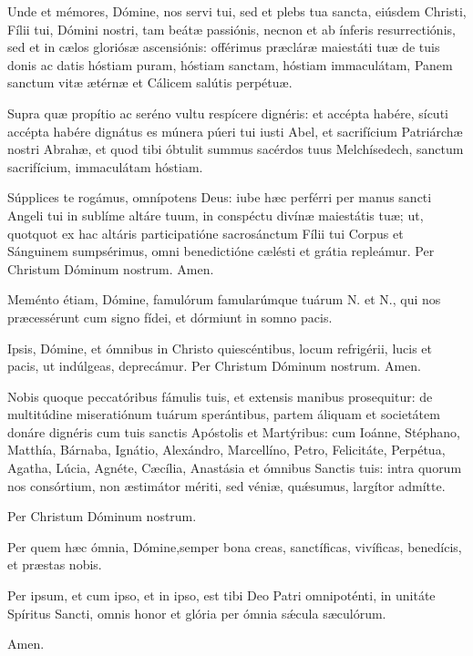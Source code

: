 Unde et mémores, Dómine, nos servi tui, sed et plebs tua sancta, eiúsdem Christi, Fílii tui, Dómini nostri, tam beátæ passiónis, necnon et ab ínferis resurrectiónis, sed et in cælos gloriósæ ascensiónis: offérimus præcláræ maiestáti tuæ de tuis donis ac datis hóstiam puram, hóstiam sanctam, hóstiam immaculátam, Panem sanctum vitæ ætérnæ et Cálicem salútis perpétuæ.

Supra quæ propítio ac seréno vultu respícere dignéris: et accépta habére, sícuti accépta habére dignátus es múnera púeri tui iusti Abel, et sacrifícium Patriárchæ nostri Abrahæ, et quod tibi óbtulit summus sacérdos tuus Melchísedech, sanctum sacrifícium, immaculátam hóstiam.

Súpplices te rogámus, omnípotens Deus: iube hæc perférri per manus sancti Angeli tui in sublíme altáre tuum, in conspéctu divínæ maiestátis tuæ; ut, quotquot ex hac altáris participatióne sacrosánctum Fílii tui Corpus et Sánguinem sumpsérimus, omni benedictióne cælésti et grátia repleámur. Per Christum Dóminum nostrum. Amen.

Meménto étiam, Dómine, famulórum famularúmque tuárum {\color{red}N.} et {\color{red}N.}, qui nos præcessérunt cum signo fídei, et dórmiunt in somno pacis.

Ipsis, Dómine, et ómnibus in Christo quiescéntibus, locum refrigérii, lucis et pacis, ut indúlgeas, deprecámur. Per Christum Dóminum nostrum. Amen.

Nobis quoque peccatóribus fámulis tuis, et extensis manibus prosequitur: de multitúdine miseratiónum tuárum sperántibus, partem áliquam et societátem donáre dignéris cum tuis sanctis Apóstolis et Martýribus: cum Ioánne, Stéphano, Matthía, Bárnaba, Ignátio, Alexándro, Marcellíno, Petro, Felicitáte, Perpétua, Agatha, Lúcia, Agnéte, Cæcília, Anastásia et ómnibus Sanctis tuis: intra quorum nos consórtium, non æstimátor mériti, sed véniæ, quǽsumus, largítor admítte.

Per Christum Dóminum nostrum.

Per quem hæc ómnia, Dómine,semper bona creas, sanctíficas, vivíficas, benedícis, et præstas nobis.

Per ipsum, et cum ipso, et in ipso, est tibi Deo Patri omnipoténti, in unitáte Spíritus Sancti, omnis honor et glória per ómnia sǽcula sæculórum.

\Rbardot{} Amen.
